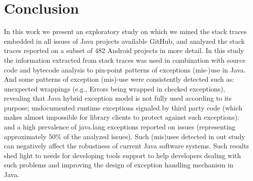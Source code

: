 \documentclass[conference]{IEEEtran}
\begin{document}

\section{Conclusion}

In this work we present an exploratory study on which we mined the stack 
traces embedded in all issues of Java projects available GitHub, and analyzed the stack traces
reported on a subset of 482 Android projects in more detail. In this study the information extracted 
from stack traces was used in combination with source code and bytecode analysis to 
pin-point patterns of exceptions (mis-)use in Java. And some patterns of exception
(mis)-use were consistently detected such as: unexpected wrappings (e.g., Errors
being wrapped in checked exceptions), revealing that Java hybrid exception
model is not fully used according to its purpose; undocumented runtime
exceptions signaled by third party code (which makes almost impossible for
library clients to protect against such exceptions); and a high prevalence of
java.lang exceptions reported on issues (representing approximately 50\% of the
analyzed issues). Such (mis)uses detected in out study can negatively affect the 
robustness of current Java software systems. Such results shed light to needs for  
 developing tools support to help developers dealing with such problems and 
improving the design of exception handling mechanism in Java.
\end{document}

